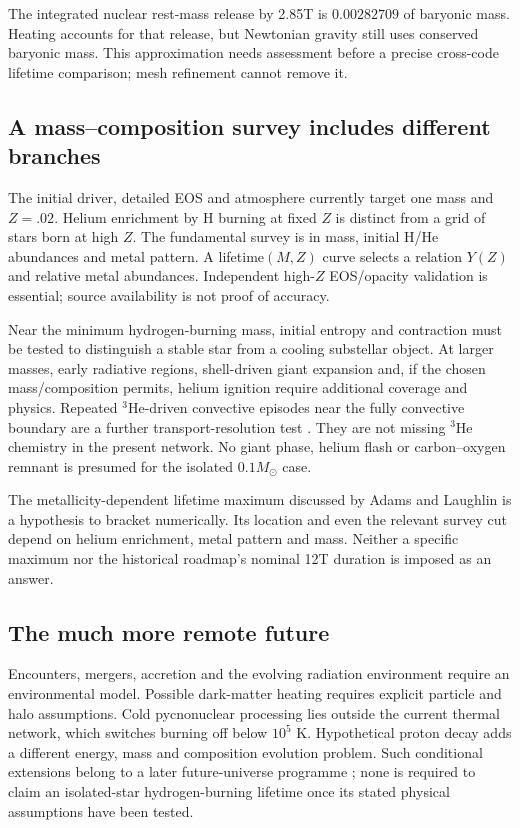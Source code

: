 \documentclass[11pt,letterpaper]{article}
\newcommand{\Ms}{M_\odot}
\begin{document}
The integrated nuclear rest-mass release by 2.85T is $0.00282709$ of baryonic
mass. Heating accounts for that release, but Newtonian gravity still uses
conserved baryonic mass. This approximation needs assessment before a precise
cross-code lifetime comparison; mesh refinement cannot remove it.

\subsection{A mass--composition survey includes different branches}
The initial driver, detailed EOS and atmosphere currently target one mass and
$Z=.02$. Helium enrichment by H burning at fixed $Z$ is distinct from a grid
of stars born at high $Z$. The fundamental survey is in mass, initial H/He
abundances and metal pattern. A lifetime$(M,Z)$ curve selects a relation $Y(Z)$
and relative metal abundances. Independent high-$Z$ EOS/opacity validation is
essential; source availability is not proof of accuracy.

Near the minimum hydrogen-burning mass, initial entropy and contraction must
be tested to distinguish a stable star from a cooling substellar object.
At larger masses, early radiative regions, shell-driven giant expansion and,
if the chosen mass/composition permits, helium ignition require additional
coverage and physics. Repeated $^3$He-driven convective episodes near the
fully convective boundary are a further transport-resolution test
\cite{vansaders12}. They are not missing $^3$He chemistry in the present network.
No giant phase, helium flash or carbon--oxygen remnant is presumed for the
isolated $0.1\Ms$ case.

The metallicity-dependent lifetime maximum discussed by Adams and Laughlin
\cite{adams97} is a hypothesis to bracket numerically. Its location and even
the relevant survey cut depend on helium enrichment, metal pattern and mass.
Neither a specific maximum nor the historical roadmap's nominal 12T duration
is imposed as an answer.

\subsection{The much more remote future}
Encounters, mergers, accretion and the evolving radiation environment require
an environmental model. Possible dark-matter heating requires explicit particle
and halo assumptions. Cold pycnonuclear processing lies outside the current
thermal network, which switches burning off below $10^5$ K. Hypothetical proton
decay adds a different energy, mass and composition evolution problem. Such
conditional extensions belong to a later future-universe programme
\cite{adams97}; none is required to claim an isolated-star hydrogen-burning
lifetime once its stated physical assumptions have been tested.
\end{document}
